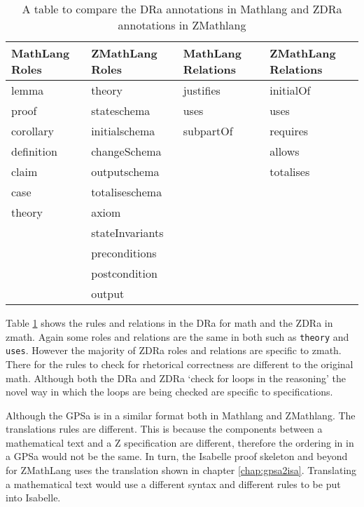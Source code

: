\begin{table}[H]
    \centering
    \begin{tabular}{|l | l || l | l |}
        \hline
        MathLang Roles & ZMathLang Roles & MathLang Relations & ZMathLang Relations \\
        \hline
        lemma & theory & justifies & initialOf \\
        proof & stateschema & uses & uses \\
        corollary & initialschema & subpartOf & requires \\
        definition & changeSchema & & allows \\
        claim & outputschema & & totalises \\
        case & totaliseschema & & \\
        theory & axiom & & \\
        & stateInvariants & & \\
        & preconditions & & \\
        & postcondition & & \\
        & output & & \\       
        \hline
    \end{tabular}
    \caption{A table to compare the DRa annotations in Mathlang and ZDRa annotations in ZMathlang \label{tab:comparedra}}
\end{table}

Table \ref{tab:comparedra} shows the rules and relations in the DRa for
\gls{math} and the ZDRa in \gls{zmath}. Again some roles and relations are the same in both
such as \texttt{theory} and \texttt{uses}. However the majority of ZDRa roles
and relations are specific to \gls{zmath}. There for the rules to check for
rhetorical correctness are different to the original \gls{math}. Although both
the DRa and ZDRa `check for loops in the reasoning' the novel way in which the
loops are being checked are specific to specifications.

Although the GPSa is in a similar format both in Mathlang and ZMathlang. The
translations rules are different. This is because the components between a
mathematical text and a Z specification are different, therefore the ordering in
in a GPSa would not be the same. In turn, the Isabelle proof skeleton and beyond
for ZMathLang uses the translation shown in chapter \ref{chap:gpsa2isa}.
Translating a mathematical text would use a different syntax and different
rules to be put into Isabelle.

